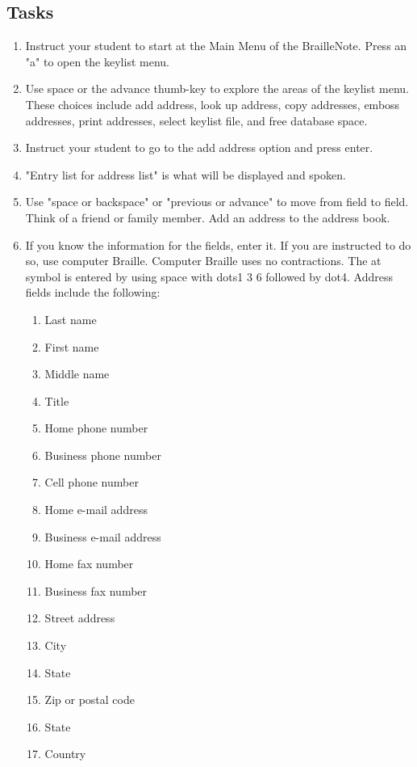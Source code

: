 \documentclass[10pt,letterpaper,twoside]{report}
\begin{document}
{{{\subsection{Tasks}
\begin{enumerate}
	\item Instruct your student to start at the Main Menu of the BrailleNote. Press an "a" to open the keylist menu.
	\item Use space or the advance thumb-key to explore the areas of the keylist menu.  These choices include add address, look up address, copy addresses, emboss addresses, print addresses, select keylist file, and free database space.
	\item Instruct your student to go to the add address option and press enter.
	\item "Entry list for address list" is what will be displayed and spoken.
	\item Use "space or backspace" or "previous or advance" to move from field to field.  Think of a friend or family member.  Add an address to the address book.
	\item If you know the information for the fields, enter it.  If you are instructed to do so, use computer Braille.  Computer Braille uses no contractions.  The at symbol is entered by using space with dots1 3 6 followed by dot4. Address fields include the following:
	      \begin{enumerate}
		      \item Last name
		      \item First name
		      \item Middle name
		      \item Title
		      \item Home phone number
		      \item Business phone number
		      \item Cell phone number
		      \item Home e-mail address
		      \item Business e-mail address
		      \item Home fax number
		      \item Business fax number
		      \item Street address
		      \item City
		      \item State
		      \item Zip or postal code
		      \item State
		      \item Country

\end{enumerate}
\end{enumerate}}}}
\end{document}

